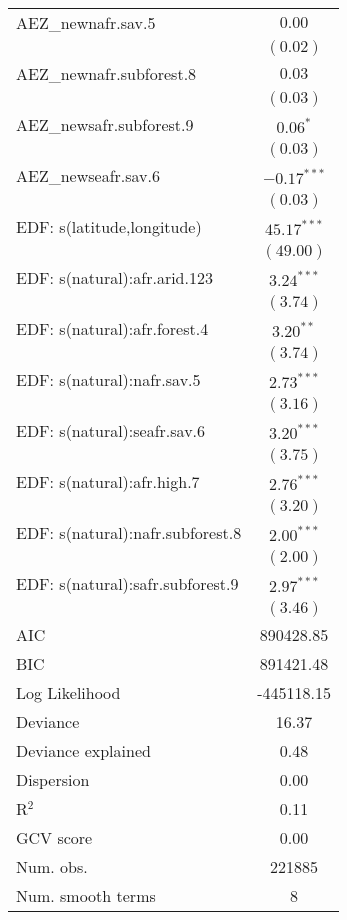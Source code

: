 \begin{longtable}{l c }
AEZ\_newnafr.sav.5               & $0.00$         \\
                                 & $(0.02)$       \\
AEZ\_newnafr.subforest.8         & $0.03$         \\
                                 & $(0.03)$       \\
AEZ\_newsafr.subforest.9         & $0.06^{*}$     \\
                                 & $(0.03)$       \\
AEZ\_newseafr.sav.6              & $-0.17^{***}$  \\
                                 & $(0.03)$       \\
EDF: s(latitude,longitude)       & $45.17^{***}$  \\
                                 & $(49.00)$      \\
EDF: s(natural):afr.arid.123     & $3.24^{***}$   \\
                                 & $(3.74)$       \\
EDF: s(natural):afr.forest.4     & $3.20^{**}$    \\
                                 & $(3.74)$       \\
EDF: s(natural):nafr.sav.5       & $2.73^{***}$   \\
                                 & $(3.16)$       \\
EDF: s(natural):seafr.sav.6      & $3.20^{***}$   \\
                                 & $(3.75)$       \\
EDF: s(natural):afr.high.7       & $2.76^{***}$   \\
                                 & $(3.20)$       \\
EDF: s(natural):nafr.subforest.8 & $2.00^{***}$   \\
                                 & $(2.00)$       \\
EDF: s(natural):safr.subforest.9 & $2.97^{***}$   \\
                                 & $(3.46)$       \\
\hline
AIC                              & 890428.85      \\
BIC                              & 891421.48      \\
Log Likelihood                   & -445118.15     \\
Deviance                         & 16.37          \\
Deviance explained               & 0.48           \\
Dispersion                       & 0.00           \\
R$^2$                            & 0.11           \\
GCV score                        & 0.00           \\
Num. obs.                        & 221885         \\
Num. smooth terms                & 8              \\
\end{longtable}
